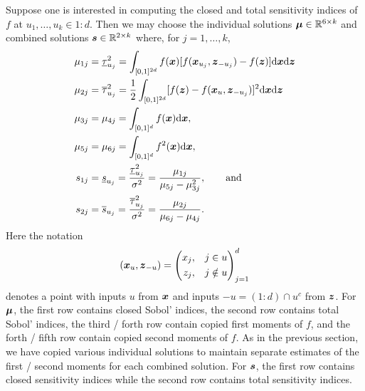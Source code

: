 \documentclass{article}[12pt]
\begin{document}
Suppose one is interested in computing the closed and total sensitivity indices of $f$ at $u_1,\dots,u_k \in 1:d$.  Then we may choose the individual solutions $\boldsymbol{\mu} \in \mathbb{R}^{6 \times k}$ and combined solutions $\boldsymbol{s} \in \mathbb{R}^{2 \times k}$ where, for $j=1,\dots,k$,
\begin{align*}
    \mu_{1j} &= \underline{\tau}_{u_j}^2 = \int_{[0,1]^{2d}} f(\boldsymbol{x})[f(\boldsymbol{x}_{u_j},\boldsymbol{z}_{-{u_j}})-f(\boldsymbol{z})]\mathrm{d}\boldsymbol{x}\mathrm{d}\boldsymbol{z} \\
    \mu_{2j} &= \overline{\tau}_{u_j}^2 = \frac{1}{2}\int_{[0,1]^{2d}} [f(\boldsymbol{z})-f(\boldsymbol{x}_u,\boldsymbol{z}_{-{u_j}})]^2\mathrm{d}\boldsymbol{x}\mathrm{d}\boldsymbol{z} \\
    \mu_{3j} &= \mu_{4j} = \int_{[0,1]^d} f(\boldsymbol{x})\mathrm{d}\boldsymbol{x}, \\
    \mu_{5j} &= \mu_{6j} = \int_{[0,1]^d} f^2(\boldsymbol{x})\mathrm{d}\boldsymbol{x}, \\
    s_{1j} &= \underline{s}_{u_j} = \frac{\underline{\tau}_{u_j}^2}{\sigma^2} = \frac{\mu_{1j}}{\mu_{5j}-\mu_{3j}^2}, \qquad \text{and} \\
    s_{2j} &= \overline{s}_{u_j} = \frac{\overline{\tau}_{u_j}^2}{\sigma^2} = \frac{\mu_{2j}}{\mu_{6j}-\mu_{4j}}.
\end{align*}
Here the notation
\begin{equation}
    (\boldsymbol{x}_{u},\boldsymbol{z}_{-u}) = \left(\begin{aligned}x_{j}, \quad & j \in u \\ z_{j}, \quad & j \notin u \end{aligned}\right)_{j=1}^d
\end{equation}
denotes a point with inputs $u$ from $\boldsymbol{x}$ and inputs $-u=(1:d)\cap u^c$ from $\boldsymbol{z}$.
For $\boldsymbol{\mu}$, the first row contains closed Sobol' indices, the second row contains total Sobol' indices, the third / forth row contain copied first moments of $f$, and the forth / fifth row contain copied second moments of $f$. As in the previous section, we have copied various individual solutions to maintain separate estimates of the first / second moments for each combined solution. For $\boldsymbol{s}$, the first row contains closed sensitivity indices while the second row contains total sensitivity indices. 
\end{document}
